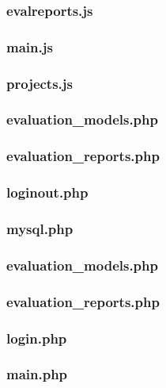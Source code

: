 \documentclass[12pt,a4paper,spanish,twoside]{article}
\begin{document}
\subsubsection{evalreports.js}

\subsubsection{main.js}

\subsubsection{projects.js}


\subsubsection{evaluation\_models.php}

\subsubsection{evaluation\_reports.php}

\subsubsection{loginout.php}

\subsubsection{mysql.php}


\subsubsection{evaluation\_models.php}

\subsubsection{evaluation\_reports.php}

\subsubsection{login.php}

\subsubsection{main.php}

\end{document}
